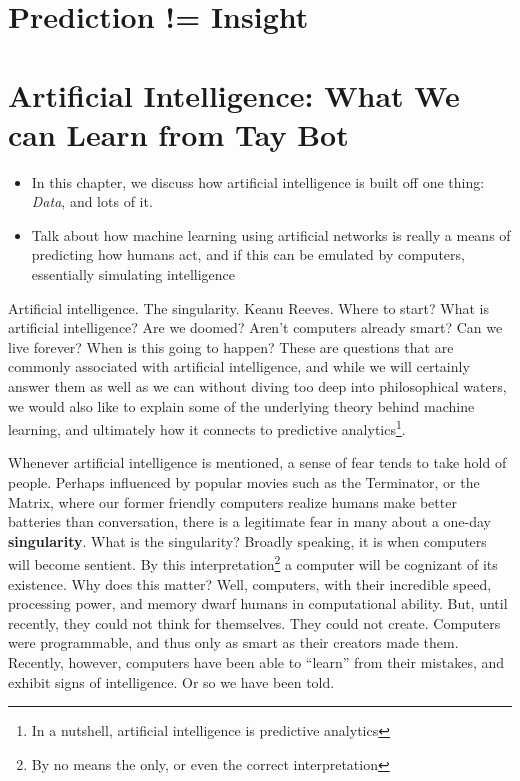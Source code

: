 \documentclass[12pt,twoside]{book}
\newcommand{\imp}[1]{\textbf{#1}}
\begin{document}
	\chapter[Tales from DataFest]{Prediction != Insight }
	\chapter[Rise of the Bots]{Artificial Intelligence: What We can Learn from Tay Bot}
	\begin{itemize}
		\item In this chapter, we discuss how artificial intelligence is built off one thing: \emph{Data}, and lots of it.
		\item Talk about how machine learning using artificial networks is really a means of predicting how humans act, and if this can be emulated by computers, essentially simulating intelligence
	\end{itemize}
	Artificial intelligence.  The singularity.  Keanu Reeves.  Where to start?  What is artificial intelligence?  Are we doomed?  Aren't computers already smart?  Can we live forever?  When is this going to happen? These are questions that are commonly associated with artificial intelligence, and while we will certainly answer them as well as we can without diving too deep into philosophical waters, we would also like to explain some of the underlying theory behind machine learning, and ultimately how it connects to predictive analytics\footnote{In a nutshell, artificial intelligence is predictive analytics}.  
	
	Whenever artificial intelligence is mentioned, a sense of fear tends to take hold of people.  Perhaps influenced by popular movies such as the Terminator, or the Matrix, where our former friendly computers realize humans make better batteries than conversation, there is a legitimate fear in many about a one-day \imp{singularity}. What is the singularity?  Broadly speaking, it is when computers will become sentient.  By this interpretation\footnote{By no means the only, or even the correct interpretation}  a computer will be cognizant of its existence.  Why does this matter?  Well, computers, with their incredible speed, processing power, and memory dwarf humans in computational ability.  But, until recently, they could not think for themselves.  They could not create.  Computers were programmable, and thus only as smart as their creators made them.  Recently, however, computers have been able to ``learn'' from their mistakes, and exhibit signs of intelligence. Or so we have been told.  
	
\end{document}
